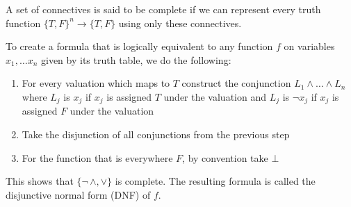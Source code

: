 \documentclass[a4paper]{article}
\theoremstyle{plain}
\theoremstyle{definition}
\newtheorem{defn}{Definition}[section]
\theoremstyle{remark}
\begin{document}
\begin{tcolorbox}[colback=black!3!white,colframe=black!60!white,title=\begin{defn}Completeness \label{Completeness}\end{defn}]
A set of connectives is said to be complete if we can represent every truth function $\{T,F\}^{n}\to \{T,F\}$ using only these connectives. 
\end{tcolorbox}
\begin{tcolorbox}[colback=black!3!white,colframe=black!60!white,title=\begin{defn}Proof By Construction \label{Proof By Construction}\end{defn}]
To create a formula that is logically equivalent to any function $f$ on variables $x_1,\ldots x_n$ given by its truth table, we do the following:
\begin{enumerate}
	\item For every valuation which maps to $T$ construct the conjunction $L_1 \land \ldots \land L_n$ where $L_j$ is $x_j$ if $x_j$ is assigned $T$ under the valuation and $L_j$ is $\neg x_j$ if $x_j$ is assigned $F$ under the valuation
	\item Take the disjunction of all conjunctions from the previous step
	\item For the function that is everywhere $F$, by convention take $\bot$
\end{enumerate}
This shows that $\{ \neg\, \land, \lor\}$ is complete. The resulting formula is called the disjunctive normal form (DNF) of $f$.
\end{tcolorbox}
\end{document}
